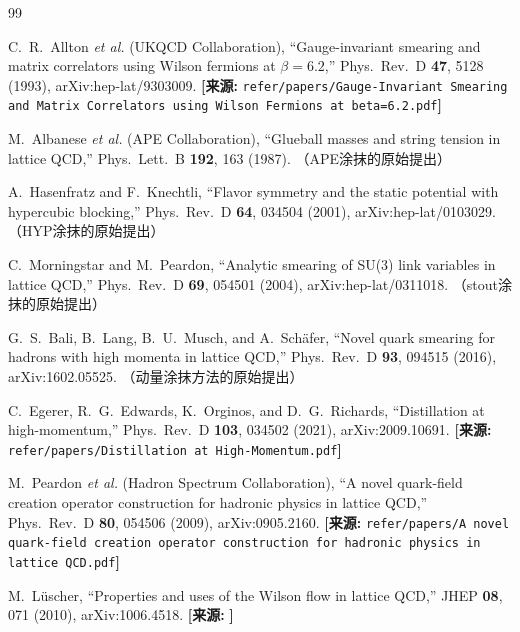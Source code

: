 \documentclass[12pt,a4paper]{ctexart}
\theoremstyle{definition}
\begin{document}
\begin{thebibliography}{99}


C.~R.~Allton \textit{et al.} (UKQCD Collaboration),
``Gauge-invariant smearing and matrix correlators using Wilson fermions at $\beta=6.2$,''
Phys.\ Rev.\ D \textbf{47}, 5128 (1993), arXiv:hep-lat/9303009.
\quad\textbf{[来源:} \texttt{refer/papers/Gauge-Invariant Smearing and Matrix Correlators using Wilson Fermions at beta=6.2.pdf}\textbf{]}

M.~Albanese \textit{et al.} (APE Collaboration),
``Glueball masses and string tension in lattice QCD,''
Phys.\ Lett.\ B \textbf{192}, 163 (1987).
\quad（APE涂抹的原始提出）

A.~Hasenfratz and F.~Knechtli,
``Flavor symmetry and the static potential with hypercubic blocking,''
Phys.\ Rev.\ D \textbf{64}, 034504 (2001), arXiv:hep-lat/0103029.
\quad（HYP涂抹的原始提出）

C.~Morningstar and M.~Peardon,
``Analytic smearing of SU(3) link variables in lattice QCD,''
Phys.\ Rev.\ D \textbf{69}, 054501 (2004), arXiv:hep-lat/0311018.
\quad（stout涂抹的原始提出）


G.~S.~Bali, B.~Lang, B.~U.~Musch, and A.~Sch\"afer,
``Novel quark smearing for hadrons with high momenta in lattice QCD,''
Phys.\ Rev.\ D \textbf{93}, 094515 (2016), arXiv:1602.05525.
\quad（动量涂抹方法的原始提出）

C.~Egerer, R.~G.~Edwards, K.~Orginos, and D.~G.~Richards,
``Distillation at high-momentum,''
Phys.\ Rev.\ D \textbf{103}, 034502 (2021), arXiv:2009.10691.
\quad\textbf{[来源:} \texttt{refer/papers/Distillation at High-Momentum.pdf}\textbf{]}

M.~Peardon \textit{et al.} (Hadron Spectrum Collaboration),
``A novel quark-field creation operator construction for hadronic physics in lattice QCD,''
Phys.\ Rev.\ D \textbf{80}, 054506 (2009), arXiv:0905.2160.
\quad\textbf{[来源:} \texttt{refer/papers/A novel quark-field creation operator construction for hadronic physics in lattice QCD.pdf}\textbf{]}


M.~L\"uscher,
``Properties and uses of the Wilson flow in lattice QCD,''
JHEP \textbf{08}, 071 (2010), arXiv:1006.4518.
\quad\textbf{[来源:} \texttt{}\textbf{]}


\end{thebibliography}
\end{document}
